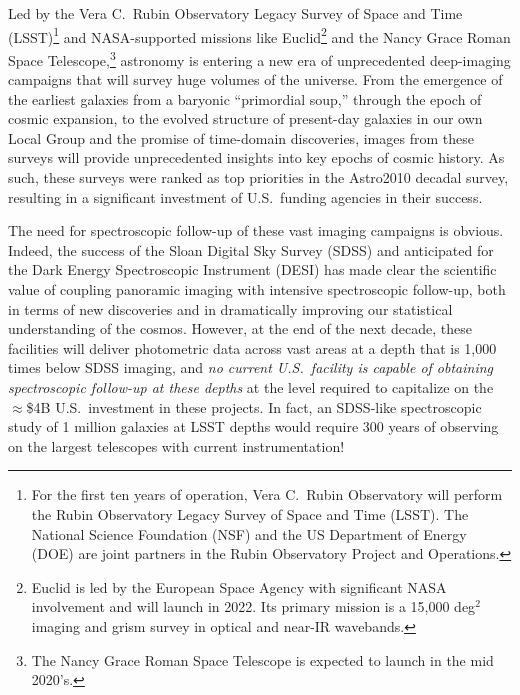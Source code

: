 \documentclass[11pt,a4paper,twoside,onecolumn,openany,final,oldfontcommands]{memoir}
\begin{document}
Led by the Vera C.~Rubin Observatory Legacy Survey of Space and Time (LSST)\footnote{For the first ten years of operation, Vera C.~Rubin Observatory will perform the Rubin Observatory Legacy Survey of Space and Time (LSST). The National Science Foundation (NSF) and the US Department of Energy (DOE) are joint partners in the Rubin Observatory Project and Operations.} and NASA-supported missions like Euclid\footnote{Euclid is led by the European Space Agency with significant NASA involvement and will launch in 2022. Its primary mission is a 15,000 deg$^2$ imaging and grism survey in optical and near-IR wavebands.} and the Nancy Grace Roman Space Telescope,\footnote{The Nancy Grace Roman Space Telescope is expected to launch in the mid 2020's.} astronomy is entering a new era of unprecedented deep-imaging campaigns that will survey huge volumes of the universe. From the emergence of the earliest galaxies from a baryonic ``primordial soup,'' through the epoch of cosmic expansion, to the evolved structure of present-day galaxies in our own Local Group and the promise of time-domain discoveries, images from these surveys will provide unprecedented insights into key epochs of cosmic history. As such, these surveys were ranked as top priorities in the Astro2010 decadal survey, resulting in a significant investment of U.S.\ funding agencies in their success.

The need for spectroscopic follow-up of these vast imaging campaigns is obvious.  Indeed, the success of the Sloan Digital Sky Survey (SDSS) and anticipated for the Dark Energy Spectroscopic Instrument (DESI) has made clear the scientific value of coupling panoramic imaging with intensive spectroscopic follow-up, both in terms of new discoveries and in dramatically improving our statistical understanding of the cosmos.  However, at the end of the next decade, these facilities will deliver photometric data across vast areas at a depth that is 1,000 times below SDSS imaging, and {\it no current U.S.~facility is capable of obtaining spectroscopic follow-up at these depths} at the level required to capitalize on the $\approx$\$4B U.S.\ investment in these projects. In fact, an SDSS-like spectroscopic study of 1 million galaxies at LSST depths would require 300 years of observing on the largest telescopes with current instrumentation!
\end{document}
